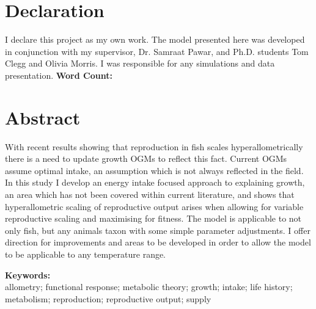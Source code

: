\documentclass[a4paper, 11pt, hidelinks]{article} %
\newcommand\wordcount{} %
\begin{document}
	
	

	\section*{Declaration}
	I declare this project as my own work.  The model presented here was developed in conjunction with my supervisor, Dr. Samraat Pawar, and Ph.D. students Tom Clegg and Olivia Morris.  I was responsible for any simulations and data presentation.\newline
	\textbf{Word Count: \wordcount}

	\newpage
	
	\section*{Abstract}
	\linenumbers
	With recent results showing that reproduction in fish scales hyperallometrically there is a need to update growth OGMs to reflect this fact.  Current OGMs assume optimal intake, an assumption which is not always reflected in the field.  In this study I develop an energy intake focused approach to explaining growth, an area which has not been covered within current literature, and shows that hyperallometric scaling of reproductive output arises when allowing for variable reproductive scaling and maximising for fitness.  The model is applicable to not only fish, but any animals taxon with some simple parameter adjustments.  I offer direction for improvements and areas to be developed in order to allow the model to be applicable to any temperature range.
	\vspace*{0.5 cm}
	\newline
%	

	\textbf{Keywords:}\\
	allometry; functional response; metabolic theory; growth; intake; life history; metabolism; reproduction; reproductive output; supply

	
	
	\nolinenumbers
	
\end{document}
